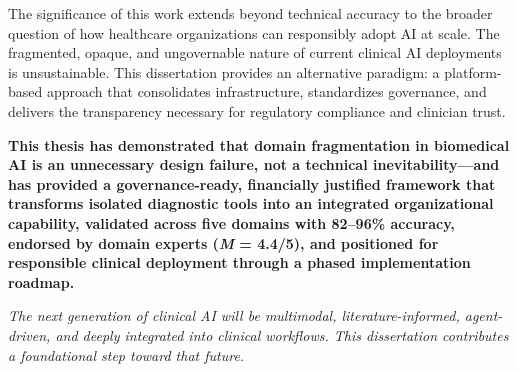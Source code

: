 The significance of this work extends beyond technical accuracy to the broader question of how healthcare organizations can responsibly adopt AI at scale. The fragmented, opaque, and ungovernable nature of current clinical AI deployments is unsustainable. This dissertation provides an alternative paradigm: a platform-based approach that consolidates infrastructure, standardizes governance, and delivers the transparency necessary for regulatory compliance and clinician trust.

\textbf{This thesis has demonstrated that domain fragmentation in biomedical AI is an unnecessary design failure, not a technical inevitability---and has provided a governance-ready, financially justified framework that transforms isolated diagnostic tools into an integrated organizational capability, validated across five domains with 82--96\% accuracy, endorsed by domain experts (\textit{M} = 4.4/5), and positioned for responsible clinical deployment through a phased implementation roadmap.}

\vspace{1cm}

\noindent\textit{The next generation of clinical AI will be multimodal, literature-informed, agent-driven, and deeply integrated into clinical workflows. This dissertation contributes a foundational step toward that future.}
